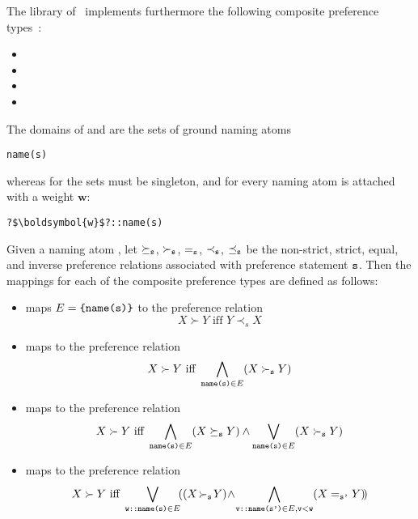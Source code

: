 %

The library of \asprin\ implements furthermore the following composite preference types~\cite{sonpon06a}: 
\begin{itemize}
\item {}
\item {}
\item {}
\item {}
\end{itemize}
The domains of  and  are the sets of ground naming atoms
\begin{lstlisting}[numbers=none,escapechar=?]
name(s)
\end{lstlisting}
whereas for  the sets must be singleton, 
and for  every naming atom is attached with a weight $\textbf{w}$: 
\begin{lstlisting}[numbers=none,escapechar=?]
?$\boldsymbol{w}$?::name(s)
\end{lstlisting}
Given a naming atom , 
let $\succeq_{\texttt{s}}$, $\succ_{\texttt{s}}$, $=_{\texttt{s}}$, $\prec_{\texttt{s}}$, $\preceq_{\texttt{s}}$ be the 
non-strict, strict, equal, and inverse preference relations associated with preference statement $\texttt{s}$.
Then the mappings for each of the composite preference types are defined as follows:
\begin{itemize}
\item
{} maps $E=\texttt{\{name(s)\}}$ to the preference relation
\[
X \succ Y \text{ iff } Y \prec_s X
\]
\item 
{} maps  to the preference relation 
\[
X \succ Y \text{ iff } \bigwedge_{\texttt{name(s)}\in E}(X\succ_{\texttt{s}} Y)
\]
\item 
{} maps  to the preference relation 
\[
X \succ Y \text{ iff } \bigwedge_{\texttt{name(s)}\in E} (X\succeq_{\texttt{s}} Y)\wedge\bigvee_{\texttt{name(s)}\in E} (X\succ_{\texttt{s}} Y)
\]
\item
{} maps  to the preference relation 
\[
X \succ Y \text{ iff } \bigvee_{\texttt{w::name(s)}\in E}\!((X\!\succ_{\texttt{s}} \!Y)\!\wedge\!\bigwedge_{\texttt{v::name(s')}\in E,\texttt{v}<\texttt{w}}(X =_{\texttt{s'}} Y)\!)
\] 
\end{itemize} 

